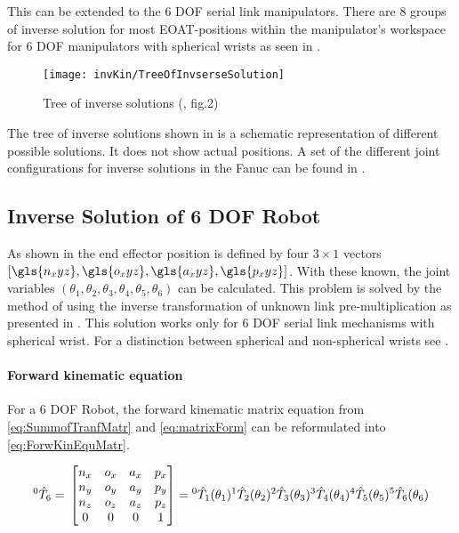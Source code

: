 This can be extended to the 6 \ac{DOF} serial link manipulators.
There are 8 groups of inverse solution for most \ac{EOAT}-positions within the manipulator's workspace \cite{invKinSolYanWu} for 6 \ac{DOF} manipulators with spherical wrists as seen in . 

\begin{figure}[H]
	\texttt{[image: invKin/TreeOfInvserseSolution]}
	\caption{Tree of inverse solutions (\cite{invKinSolYanWu}, fig.2)}
	\label{fig:invKinTree}
\end{figure}
%
The tree of inverse solutions shown in  is a schematic representation of different possible solutions. It does not show actual positions. A set of the different joint configurations for inverse solutions in the Fanuc can be found in .


\subsection{Inverse Solution of 6 \ac{DOF} Robot} \label{sec:InvSol6DOF}

As shown in  the end effector position is defined by four $3 \times 1$ vectors $[\gls{n_xyz},\gls{o_xyz},\gls{a_xyz},\gls{p_xyz}]$. With these known, the joint variables $(\theta_1, \theta_2, \theta_3, \theta_4, \theta_5, \theta_6)$ can be calculated.
This problem  is solved by the method of using the inverse transformation of unknown link pre-multiplication as presented %
in \cite{invKinSolYanWu}. This solution works only for 6 \ac{DOF} serial link mechanisms with spherical wrist. 
For a distinction between spherical and non-spherical wrists see .

\paragraph{Forward kinematic equation}
For a  6 \ac{DOF} Robot, the  forward kinematic matrix equation from \ref{eq:SummofTranfMatr} and \ref{eq:matrixForm} can be reformulated into  \ref{eq:ForwKinEquMatr}.

\begin{equation}\label{eq:ForwKinEquMatr}
	^0\hat{T}_6 = \\
	\begin{bmatrix}
n_x & o_x & a_x & p_x \\
n_y & o_y & a_y & p_y \\
n_z & o_z & a_z & p_z \\
0 & 0 & 0 & 1 \\
\end{bmatrix}
=
\phantom{}^0\hat{T}_1(\theta_1)\phantom{}^1\hat{T}_2(\theta_2)\phantom{}^2\hat{T}_3(\theta_3)\phantom{}^3\hat{T}_4(\theta_4)\phantom{}^4\hat{T}_5(\theta_5)\phantom{}^5\hat{T}_6(\theta_6)\\
\end{equation}

